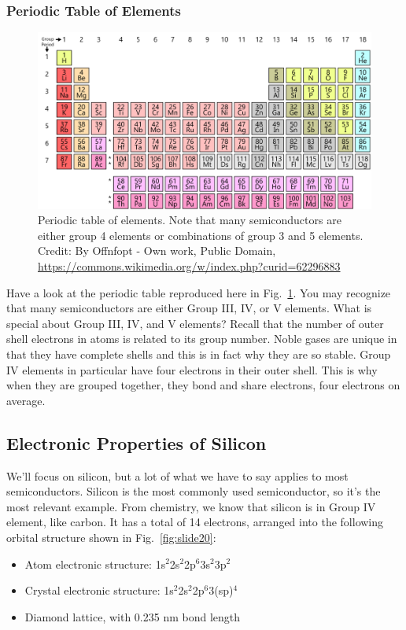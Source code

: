 \subsubsection{Periodic Table of Elements}
\begin{figure}
\centering
\includegraphics[width=\columnwidth]{periodic_table}
\caption{Periodic table of elements.  Note that many semiconductors are either group 4 elements or combinations of group 3 and 5 elements. Credit:  By Offnfopt - Own work, Public Domain, \url{https://commons.wikimedia.org/w/index.php?curid=62296883}}
\label{fig:periodic_table}
\end{figure}
Have a look at the periodic table reproduced here in Fig.~\ref{fig:periodic_table}.  You may recognize that many semiconductors are either Group III, IV, or V elements.  What is special about Group III, IV, and V elements?  Recall that the number of outer shell electrons in atoms is related to its group number.  Noble gases are unique in that they have complete shells and this is in fact why they are so stable.  Group IV elements in particular have four electrons in their outer shell.  This is why when they are grouped together, they bond and share electrons, four electrons on average.
\subsection{Electronic Properties of Silicon}
We'll focus on silicon, but a lot of what we have to say applies to most semiconductors.  Silicon is the most commonly used semiconductor, so it's the most relevant example.  From chemistry, we know that silicon is in Group IV element, like carbon.  It has a total of 14 electrons, arranged into the following orbital structure shown in Fig.~\ref{fig:slide20}:
\begin{itemize}
\item   Atom electronic structure: 1s$^2$2s$^2$2p$^6$3s$^2$3p$^2$
\item   Crystal electronic structure: 1s$^2$2s$^2$2p$^6$3(sp)$^4$
\item   Diamond lattice, with 0.235 nm bond length
\end{itemize}
 
